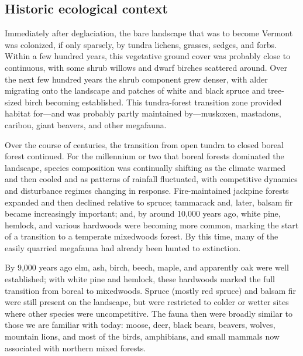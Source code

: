\documentclass[]{tufte-handout}
\begin{document}
\subsection{Historic ecological
context}\label{historic-ecological-context}

Immediately after deglaciation, the bare landscape that was to become
Vermont was colonized, if only sparsely, by tundra lichens, grasses,
sedges, and forbs. Within a few hundred years, this vegetative ground
cover was probably close to continuous, with some shrub willows and
dwarf birches scattered around. Over the next few hundred years the
shrub component grew denser, with alder migrating onto the landscape and
patches of white and black spruce and tree-sized birch becoming
established. This tundra-forest transition zone provided habitat
for---and was probably partly maintained by---muskoxen, mastadons,
caribou, giant beavers, and other megafauna.

Over the course of centuries, the transition from open tundra to closed
boreal forest continued. For the millennium or two that boreal forests
dominated the landscape, species composition was continually shifting as
the climate warmed and then cooled and as patterns of rainfall
fluctuated, with competitive dynamics and disturbance regimes changing
in response. Fire-maintained jackpine forests expanded and then declined
relative to spruce; tammarack and, later, balsam fir became increasingly
important; and, by around 10,000 years ago, white pine, hemlock, and
various hardwoods were becoming more common, marking the start of a
transition to a temperate mixedwoods forest. By this time, many of the
easily quarried megafauna had already been hunted to extinction.

By 9,000 years ago elm, ash, birch, beech, maple, and apparently oak
were well established; with white pine and hemlock, these hardwoods
marked the full transition from boreal to mixedwoods. Spruce (mostly red
spruce) and balsam fir were still present on the landscape, but were
restricted to colder or wetter sites where other species were
uncompetitive. The fauna then were broadly similar to those we are
familiar with today: moose, deer, black bears, beavers, wolves, mountain
lions, and most of the birds, amphibians, and small mammals now
associated with northern mixed forests.
\end{document}
